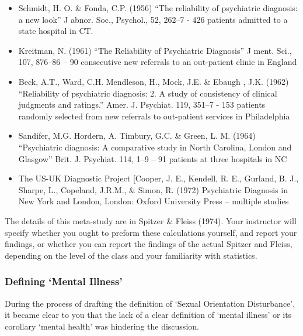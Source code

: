 \begin{itemize}
\item Schmidt, H. O. \& Fonda, C.P. (1956) ``The reliability of psychiatric diagnosis: a new look'' J abnor. Soc., Psychol., 52, 262--7 - 426 patients admitted to a state hospital in CT.

\item Kreitman, N. (1961) ``The Reliability of Psychiatric Diagnosis'' J ment. Sci., 107, 876--86 – 90 consecutive new referrals to an out-patient clinic in England

\item Beck, A.T., Ward, C.H. Mendleson, H., Mock, J.E. \& Ebaugh , J.K. (1962) ``Reliability of psychiatric diagnosis: 2. A study of consistency of clinical judgments and ratings.'' Amer. J. Psychiat. 119, 351--7 - 153 patients randomly selected from new referrals to out-patient services in Philadelphia

\item Sandifer, M.G. Hordern, A. Timbury, G.C. \& Green, L. M. (1964) ``Psychiatric diagnosis: A comparative study in North Carolina, London and Glasgow'' Brit. J. Psychiat. 114, 1--9 – 91 patients at three hospitals in NC

\item The US-UK Diagnostic Project [Cooper, J. E., Kendell, R. E., Gurland, B. J., Sharpe, L., Copeland, J.R.M., \& Simon, R. (1972) Psychiatric Diagnosis in New York and London, London: Oxford University Press – multiple studies

\end{itemize}

The details of this meta-study are in Spitzer \& Fleiss (1974). Your instructor will specify whether you ought to preform these calculations yourself, and report your findings, or whether you can report the findings of the actual Spitzer and Fleiss, depending on the level of the class and your familiarity with statistics.

\subsubsection{Defining `Mental Illness'}
\label{definingmentalillness}

During the process of drafting the definition of `Sexual Orientation Disturbance', it became clear to you that the lack of a clear definition of `mental illness' or its corollary `mental health' was hindering the discussion.

